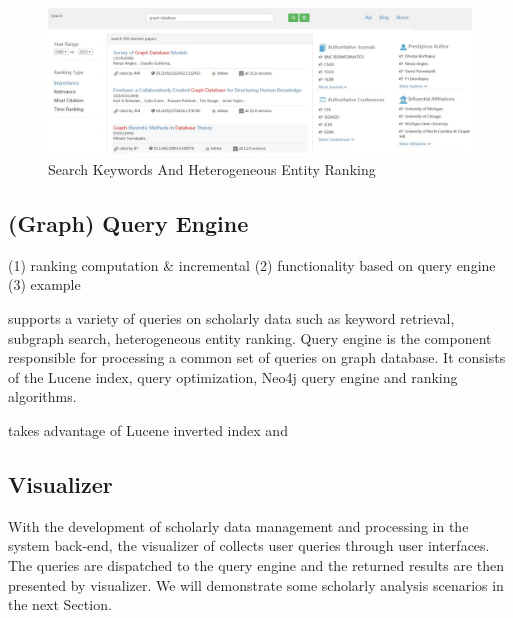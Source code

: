 

\begin{figure}[tp]
\centering
\includegraphics[width=\textwidth]{searchKeywords.pdf}
\caption{Search Keywords And Heterogeneous Entity Ranking}
\label{fig: search keywords}
\vspace{-3ex}
\end{figure}

\subsection{(Graph) Query Engine}

(1) ranking computation \& incremental
(2) functionality based on query engine
(3) example

\oursystem supports a variety of queries on scholarly data such as keyword retrieval, subgraph search, heterogeneous entity ranking. Query engine is the component responsible for processing a common set of queries on graph database. It consists of the Lucene index, query optimization, Neo4j query engine and ranking algorithms.

\oursystem takes advantage of Lucene inverted index and 


\subsection{Visualizer}
With the development of scholarly data management and processing in the system back-end, the visualizer of \oursystem collects user queries through user interfaces. The queries are dispatched to the query engine and the returned results are then presented by visualizer.
We will demonstrate some scholarly analysis scenarios in the next Section.


